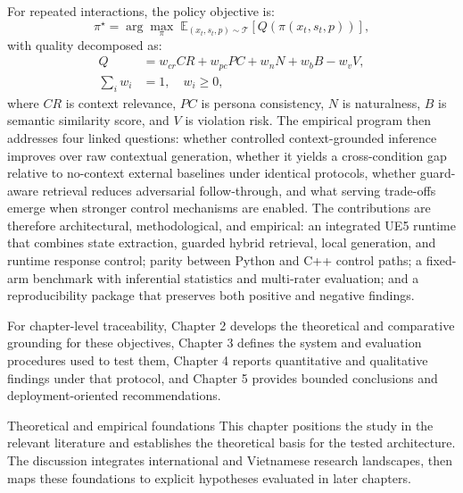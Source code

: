 ﻿\documentclass[a4paper,12pt]{article}
\makeatletter
\let\origsection\section
\renewcommand{\section}{%
  \@ifstar{\origsection*}{%
    \ifnum\value{section}>0
      \clearpage
      \thispagestyle{empty}\null\clearpage
    \else
      \clearpage
    \fi
    \origsection}%
}
\makeatother
\begin{document}
For repeated interactions, the policy objective is:
\begin{equation}
\pi^\star=\arg\max_{\pi}\;\mathbb{E}_{(x_t,s_t,p)\sim\mathcal{T}}\left[Q\!\left(\pi(x_t,s_t,p)\right)\right],
\end{equation}
with quality decomposed as:
\begin{equation}
\begin{aligned}
Q &= w_{cr}CR + w_{pc}PC + w_nN + w_bB - w_vV,\\
\sum_i w_i &= 1,\quad w_i\ge0,
\end{aligned}
\end{equation}
where \(CR\) is context relevance, \(PC\) is persona consistency, \(N\) is naturalness, \(B\) is semantic similarity score, and \(V\) is violation risk. The empirical program then addresses four linked questions: whether controlled context-grounded inference improves over raw contextual generation, whether it yields a cross-condition gap relative to no-context external baselines under identical protocols, whether guard-aware retrieval reduces adversarial follow-through, and what serving trade-offs emerge when stronger control mechanisms are enabled. The contributions are therefore architectural, methodological, and empirical: an integrated UE5 runtime that combines state extraction, guarded hybrid retrieval, local generation, and runtime response control; parity between Python and C++ control paths; a fixed-arm benchmark with inferential statistics and multi-rater evaluation; and a reproducibility package that preserves both positive and negative findings.

For chapter-level traceability, Chapter 2 develops the theoretical and comparative grounding for these objectives, Chapter 3 defines the system and evaluation procedures used to test them, Chapter 4 reports quantitative and qualitative findings under that protocol, and Chapter 5 provides bounded conclusions and deployment-oriented recommendations.

\section{Theoretical and empirical foundations}
This chapter positions the study in the relevant literature and establishes the theoretical basis for the tested architecture. The discussion integrates international and Vietnamese research landscapes, then maps these foundations to explicit hypotheses evaluated in later chapters.
\end{document}
